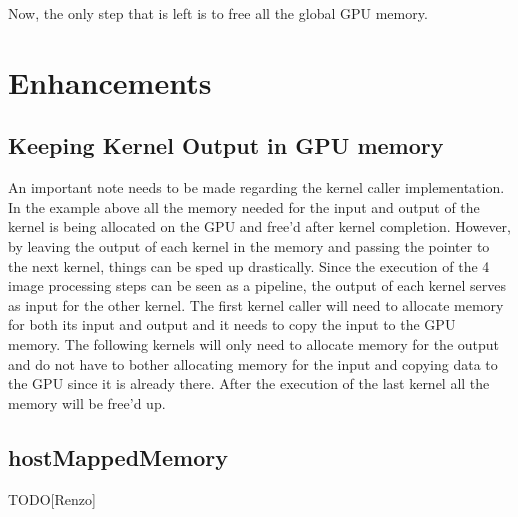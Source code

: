 \documentclass[final]{report}
\begin{document}
Now, the only step that is left is to free all the global GPU memory.

\section{Enhancements}
\subsection{Keeping Kernel Output in GPU memory}
An important note needs to be made regarding the kernel caller implementation.
In the example above all the memory needed for the input and output of the kernel is being allocated on the GPU and free'd after kernel completion.
However, by leaving the output of each kernel in the memory and passing the pointer to the next kernel, things can be sped up drastically.
Since the execution of the 4 image processing steps can be seen as a pipeline, the output of each kernel serves as input for the other kernel.
The first kernel caller will need to allocate memory for both its input and output and it needs to copy the input to the GPU memory.
The following kernels will only need to allocate memory for the output and do not have to bother allocating memory for the input and copying data to the GPU since it is already there.
After the execution of the last kernel all the memory will be free'd up.

\subsection{hostMappedMemory}
TODO[Renzo]
\end{document}
